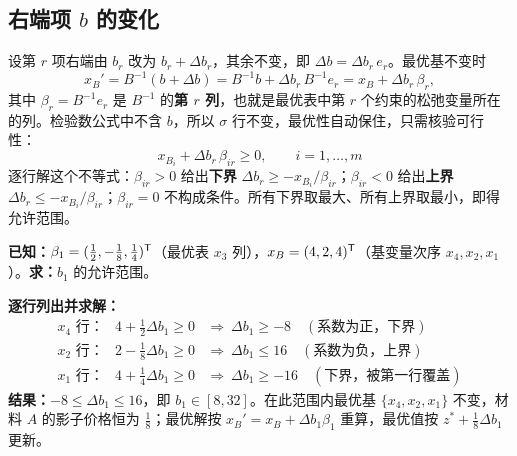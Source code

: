 \begin{summarybox}[灵敏度分析的四个步骤（课件 P49）]
\end{summarybox}

\subsection{右端项 $b$ 的变化}

\begin{proofbox}
设第 $r$ 项右端由 $b_r$ 改为 $b_r+\Delta b_r$，其余不变，即 $\Delta b=\Delta b_r\,e_r$。最优基不变时
\[
x_B'=B^{-1}(b+\Delta b)=B^{-1}b+\Delta b_r\,B^{-1}e_r=x_B+\Delta b_r\,\beta_r ,
\]
其中 $\beta_r=B^{-1}e_r$ 是 $B^{-1}$ 的\textbf{第 $r$ 列}，也就是最优表中第 $r$ 个约束的松弛变量所在的列。检验数公式中不含 $b$，所以 $\sigma$ 行不变，最优性自动保住，只需核验可行性：
\[
\boxed{\;x_{B_i}+\Delta b_r\,\beta_{ir}\ge0,\qquad i=1,\dots,m\;}
\]
逐行解这个不等式：$\beta_{ir}>0$ 给出\textbf{下界} $\Delta b_r\ge-x_{B_i}/\beta_{ir}$；$\beta_{ir}<0$ 给出\textbf{上界} $\Delta b_r\le-x_{B_i}/\beta_{ir}$；$\beta_{ir}=0$ 不构成条件。所有下界取最大、所有上界取最小，即得允许范围。
\end{proofbox}

\begin{examplebox}
\textbf{已知：}$\beta_1=(\frac12,-\frac18,\frac14)^{\mathsf T}$（最优表 $x_3$ 列），$x_B=(4,2,4)^{\mathsf T}$（基变量次序 $x_4,x_2,x_1$）。\quad\textbf{求：}$b_1$ 的允许范围。\par
\textbf{逐行列出并求解：}
\[
\begin{array}{lll}
x_4\text{ 行：} & 4+\frac12\Delta b_1\ge0 & \Rightarrow\ \Delta b_1\ge-8\quad(\text{系数为正，下界})\\[2pt]
x_2\text{ 行：} & 2-\frac18\Delta b_1\ge0 & \Rightarrow\ \Delta b_1\le16\quad(\text{系数为负，上界})\\[2pt]
x_1\text{ 行：} & 4+\frac14\Delta b_1\ge0 & \Rightarrow\ \Delta b_1\ge-16\quad(\text{下界，被第一行覆盖})
\end{array}
\]
\textbf{结果：}$-8\le\Delta b_1\le16$，即 $b_1\in[8,32]$。在此范围内最优基 $\{x_4,x_2,x_1\}$ 不变，材料 $A$ 的影子价格恒为 $\frac18$；最优解按 $x_B'=x_B+\Delta b_1\beta_1$ 重算，最优值按 $z^*+\frac18\Delta b_1$ 更新。
\end{examplebox}

